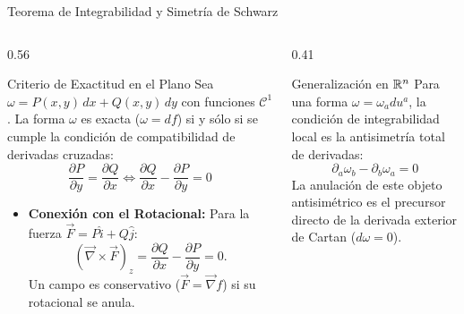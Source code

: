 \documentclass[10pt,aspectratio=169]{beamer}
\begin{document}
\begin{frame}{Teorema de Integrabilidad y Simetría de Schwarz}
  \begin{columns}[c]
    \begin{column}{0.56\textwidth}
      \footnotesize
      \begin{block}{Criterio de Exactitud en el Plano}
        Sea $\omega = P(x, y)\,dx + Q(x, y)\,dy$ con funciones $\mathcal{C}^1$. La forma $\omega$ es exacta ($\omega = df$) si y sólo si se cumple la condición de compatibilidad de derivadas cruzadas:
        \[
        \boxed{\frac{\partial P}{\partial y} = \frac{\partial Q}{\partial x} \iff \frac{\partial Q}{\partial x} - \frac{\partial P}{\partial y} = 0}
        \]
      \end{block}
      \begin{itemize}\itemsep2pt
        \item \textbf{Conexión con el Rotacional:}
        Para la fuerza $\vec{F} = P\hat{i} + Q\hat{j}$:
        \[
        (\vec{\nabla} \times \vec{F})_z = \frac{\partial Q}{\partial x} - \frac{\partial P}{\partial y} = 0.
        \]
        Un campo es conservativo ($\vec{F} = \vec{\nabla}f$) si su rotacional se anula.
      \end{itemize}
    \end{column}
    \begin{column}{0.41\textwidth}
      \footnotesize
      \begin{block}{Generalización en $\mathbb{R}^n$}
        \scriptsize
        Para una forma $\omega = \omega_a du^a$, la condición de integrabilidad local es la antisimetría total de derivadas:
        \[
        \boxed{\partial_a \omega_b - \partial_b \omega_a = 0}
        \]
        La anulación de este objeto antisimétrico es el precursor directo de la derivada exterior de Cartan ($d\omega = 0$).
      \end{block}
    \end{column}
  \end{columns}
\end{frame}
\end{document}
